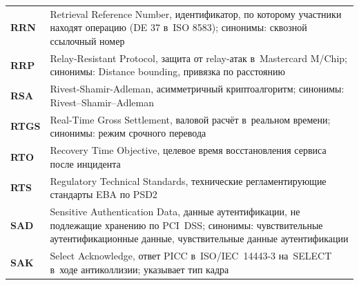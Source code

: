 \begin{longtable}{@{}p{4.5em}p{\dimexpr\linewidth-4.5em-2\tabcolsep\relax}@{}}
  \textbf{RRN}               & Retrieval Reference Number, идентификатор, по которому участники находят операцию (DE 37 в~ISO 8583); синонимы: сквозной ссылочный номер                                                                                                                                                          \\
  \textbf{RRP}               & Relay-Resistant Protocol, защита от relay-атак в~Mastercard M/Chip; синонимы: Distance bounding, привязка по расстоянию                                                                                                                                                                          \\
  \textbf{RSA}               & Rivest-Shamir-Adleman, асимметричный криптоалгоритм; синонимы: Rivest--Shamir--Adleman                                                                                                                                                                                                           \\
  \textbf{RTGS}              & Real-Time Gross Settlement, валовой расчёт в~реальном времени; синонимы: режим срочного перевода                                                                                                                                                                                                 \\
  \textbf{RTO}               & Recovery Time Objective, целевое время восстановления сервиса после инцидента                                                                                                                                                                                                                    \\
  \textbf{RTS}               & Regulatory Technical Standards, технические регламентирующие стандарты EBA по PSD2                                                                                                                                                                                                               \\
  \textbf{SAD}               & Sensitive Authentication Data, данные аутентификации, не подлежащие хранению по PCI~DSS; синонимы: чувствительные аутентификационные данные, чувствительные данные аутентификации                                                                                                                \\
  \textbf{SAK}               & Select Acknowledge, ответ PICC в~ISO/IEC~14443-3 на~SELECT в~ходе антиколлизии; указывает тип кадра                                                                                                                                                                                             \\

\end{longtable}
